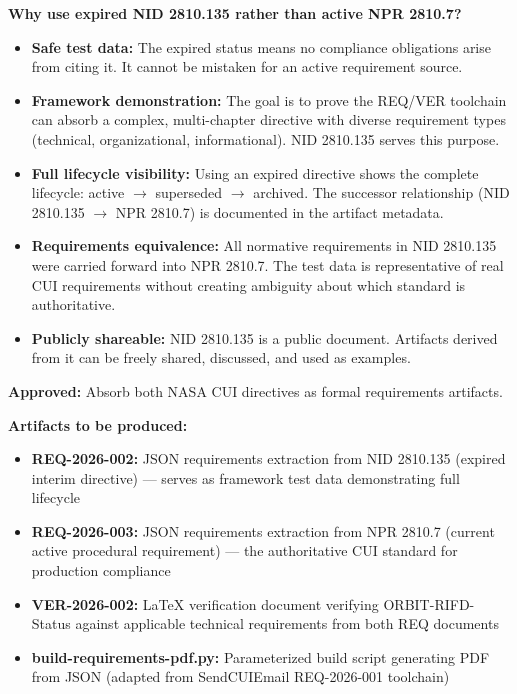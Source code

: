{\begin{enumerate}
\textbf{Why use expired NID 2810.135 rather than active NPR 2810.7?}

\begin{itemize}
    \item \textbf{Safe test data:} The expired status means no compliance obligations arise from citing it. It cannot be mistaken for an active requirement source.
    \item \textbf{Framework demonstration:} The goal is to prove the REQ/VER toolchain can absorb a complex, multi-chapter directive with diverse requirement types (technical, organizational, informational). NID 2810.135 serves this purpose.
    \item \textbf{Full lifecycle visibility:} Using an expired directive shows the complete lifecycle: active $\rightarrow$ superseded $\rightarrow$ archived. The successor relationship (NID 2810.135 $\rightarrow$ NPR 2810.7) is documented in the artifact metadata.
    \item \textbf{Requirements equivalence:} All normative requirements in NID 2810.135 were carried forward into NPR 2810.7. The test data is representative of real CUI requirements without creating ambiguity about which standard is authoritative.
    \item \textbf{Publicly shareable:} NID 2810.135 is a public document. Artifacts derived from it can be freely shared, discussed, and used as examples.
\end{itemize}


\textbf{Approved:} Absorb both NASA CUI directives as formal requirements artifacts.

\textbf{Artifacts to be produced:}
\begin{itemize}
    \item \textbf{REQ-2026-002:} JSON requirements extraction from NID 2810.135 (expired interim directive) --- serves as framework test data demonstrating full lifecycle
    \item \textbf{REQ-2026-003:} JSON requirements extraction from NPR 2810.7 (current active procedural requirement) --- the authoritative CUI standard for production compliance
    \item \textbf{VER-2026-002:} LaTeX verification document verifying ORBIT-RIFD-Status against applicable technical requirements from both REQ documents
    \item \textbf{build-requirements-pdf.py:} Parameterized build script generating PDF from JSON (adapted from SendCUIEmail REQ-2026-001 toolchain)
\end{itemize}


\end{enumerate}}
